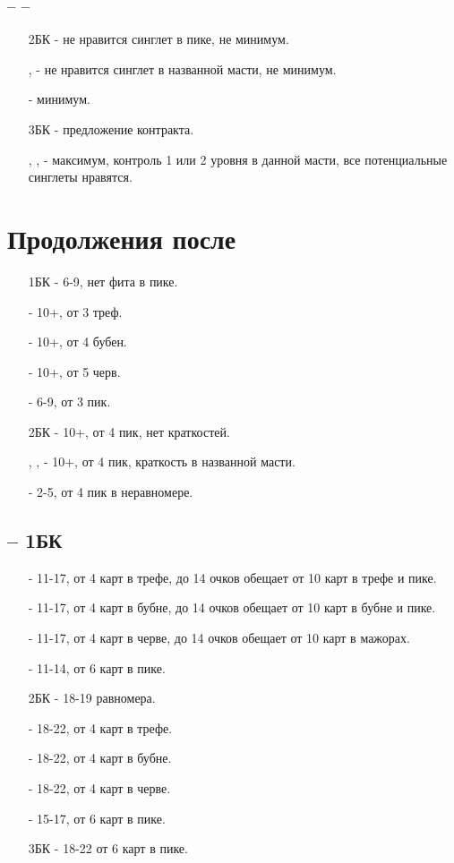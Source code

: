 \documentclass{article}
\begin{document}
\subsubsection{ --  -- }
\begin{enumerate}
    \item[2БК] - не нравится синглет в пике, не минимум.
    \item[\cl{3}, \di{3}] -  не нравится синглет в названной масти, не минимум.
    \item[\he{3}] - минимум.
    \item[3БК] - предложение контракта.
    \item[\sp{3}, \cl{4}, \di{4}] - максимум, контроль 1 или 2 уровня в данной масти, все потенциальные синглеты нравятся.
\end{enumerate}
\section{Продолжения после }
\begin{enumerate}
    \item[1БК] - 6-9, нет фита в пике.
    \item[\cl{2}] - 10+, от 3 треф.
    \item[\di{2}] - 10+, от 4 бубен.
    \item[\he{2}] - 10+, от 5 черв.
    \item[\sp{2}] - 6-9, от 3 пик.
    \item[2БК] - 10+, от 4 пик, нет краткостей.
    \item[\cl{3}, \di{3}, \he{3}] - 10+, от 4 пик, краткость в названной масти.
    \item[\sp{3}] - 2-5, от 4 пик в неравномере.
\end{enumerate}
\subsection{ -- 1БК}
\begin{enumerate}
    \item[\cl{2}] - 11-17, от 4 карт в трефе, до 14 очков обещает от 10 карт в трефе и пике. 
    \item[\di{2}] - 11-17, от 4 карт в бубне, до 14 очков обещает от 10 карт в бубне и пике. 
    \item[\he{2}] - 11-17, от 4 карт в черве, до 14 очков обещает от 10 карт в мажорах.
    \item[\sp{2}] - 11-14, от 6 карт в пике.
    \item[2БК] - 18-19 равномера.
    \item[\cl{3}] - 18-22, от 4 карт в трефе.
    \item[\di{3}] - 18-22, от 4 карт в бубне.
    \item[\he{3}] - 18-22, от 4 карт в черве.
    \item[\sp{3}] - 15-17, от 6 карт в пике.
    \item[3БК] - 18-22 от 6 карт в пике.
\end{enumerate}
\end{document}
